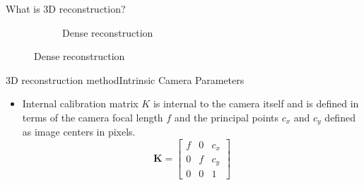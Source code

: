 \documentclass{beamer}
\begin{document}
\begin{frame}{What is 3D reconstruction?}{}
\begin{figure}[ht!]
\begin{subfigure}{.5\textwidth}
          \caption{Dense reconstruction}
          \label{fig:sub2}
      \end{subfigure}
      \label{figstart}
    \end{figure}
    \note{\textcolor{red}{Kartikeya\\}}
    \note{\textcolor{green}{Prateek\\}}
\end{frame}



\begin{frame}{3D reconstruction method}{Intrinsic Camera Parameters}
  \begin{itemize} 
    \item Internal calibration matrix  $K$ is internal to the camera itself and is defined in terms of the  camera focal length $f$ and the principal points $c_x$ and  $c_y$ defined as image centers in pixels.
  \begin{equation}
   \mathbf{K}  = 
    \begin{bmatrix}
    f & 0 & c_x \\ 0 & f & c_y \\
    0 & 0 & 1 
    \end{bmatrix}
  \end{equation}
  \end{itemize}
  \note{\textcolor{green}{Prateek\\}}
\end{frame}
\end{document}
